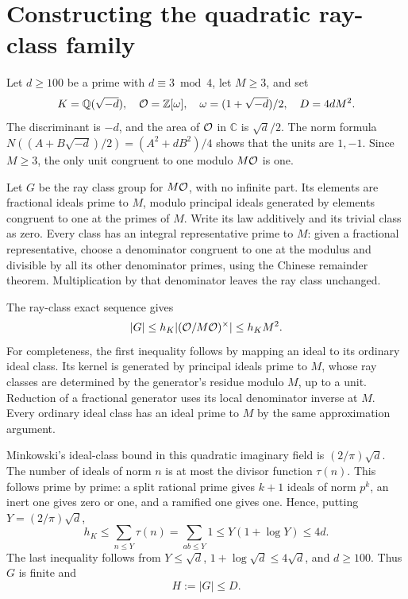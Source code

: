 \section{Constructing the quadratic ray-class family}
\label{sec:quadratic-ray-family}

Let \(d\geq100\) be a prime with \(d\equiv3\bmod4\), let \(M\geq3\),
and set
\[
 K=\mathbb Q(\sqrt{-d}),\quad
 {\cal O}=\mathbb Z[\omega],\quad
 \omega=(1+\sqrt{-d})/2,\quad D=4dM^2.
\]
The discriminant is \(-d\), and the area of \({\cal O}\) in
\(\mathbb C\) is \(\sqrt d/2\).
The norm formula
\(N((A+B\sqrt{-d})/2)=(A^2+dB^2)/4\) shows that the units are
\(1,-1\). Since \(M\geq3\), the only unit congruent to one modulo
\(M{\cal O}\) is one.

Let \(G\) be the ray class group for \(M{\cal O}\), with no infinite
part. Its elements are fractional ideals prime to \(M\), modulo
principal ideals generated by elements congruent to one at the primes
of \(M\). Write its law additively and its trivial class as zero.
Every class has an integral representative prime to \(M\): given a
fractional representative, choose a denominator congruent to one at
the modulus and divisible by all its other denominator primes, using
the Chinese remainder theorem. Multiplication by that denominator
leaves the ray class unchanged.

The ray-class exact sequence gives
\[
 |G|\leq h_K|({\cal O}/M{\cal O})^\times|\leq h_KM^2.
\]
For completeness, the first inequality follows by mapping an ideal
to its ordinary ideal class. Its kernel is generated by principal
ideals prime to \(M\), whose ray classes are determined by the
generator's residue modulo \(M\), up to a unit. Reduction of a
fractional generator uses its local denominator inverse at \(M\).
Every ordinary ideal class has an ideal prime to \(M\) by the same
approximation argument.

Minkowski's ideal-class bound in this quadratic imaginary field is
\((2/\pi)\sqrt d\). The number of ideals of norm \(n\) is at most
the divisor function \(\tau(n)\). This follows prime by prime: a
split rational prime gives \(k+1\) ideals of norm \(p^k\), an inert
one gives zero or one, and a ramified one gives one. Hence, putting
\(Y=(2/\pi)\sqrt d\),
\[
 h_K\leq\sum_{n\leq Y}\tau(n)
       =\sum_{ab\leq Y}1
       \leq Y(1+\log Y)\leq4d .
\]
The last inequality follows from \(Y\leq\sqrt d\),
\(1+\log\sqrt d\leq4\sqrt d\), and \(d\geq100\).
Thus \(G\) is finite and
\begin{equation}
 \label{eq:ray-group-budget}
                            H:=|G|\leq D.
\end{equation}

